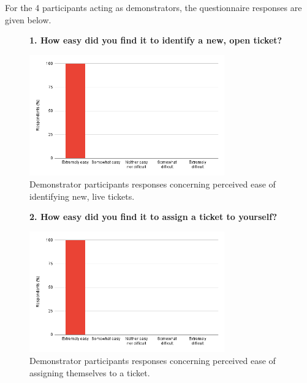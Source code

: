 For the 4 participants acting as demonstrators, the questionnaire responses are given below. 

\begin{figure}[H]
    \centering
    \textbf{1. How easy did you find it to identify a new, open ticket?}\par\medskip
    \includegraphics[width=0.75\textwidth]{10evaluation/images/dem1.png}
    \caption{Demonstrator participants responses concerning perceived ease of identifying new, live tickets.}
    \label{fig:dem1}
\end{figure}

\begin{figure}[H]
    \centering
    \textbf{2. How easy did you find it to assign a ticket to yourself?}\par\medskip
    \includegraphics[width=0.75\textwidth]{10evaluation/images/dem2.png}
    \caption{Demonstrator participants responses concerning perceived ease of assigning themselves to a ticket.}
    \label{fig:dem2}
\end{figure}

